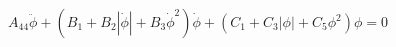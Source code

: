 \begin{equation}
A_{44} \ddot{\phi} + \left(B_{1} + B_{2} \left|{\dot{\phi}}\right| + B_{3} \dot{\phi}^{2}\right) \dot{\phi} + \left(C_{1} + C_{3} \left|{\phi}\right| + C_{5} \phi^{2}\right) \phi = 0
\end{equation}
